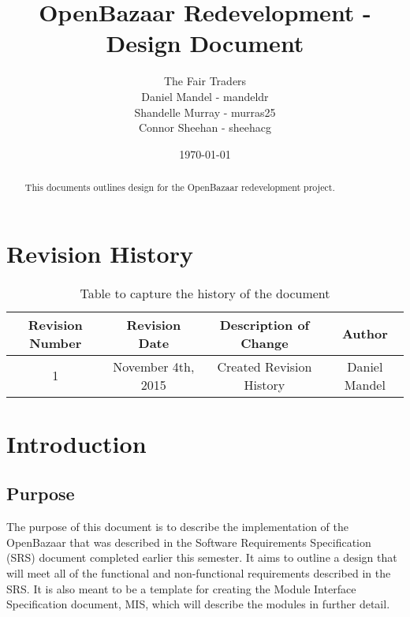 \documentclass{article}
\begin{document}
\title{OpenBazaar Redevelopment - Design Document}
\author{The Fair Traders \\ Daniel Mandel - mandeldr \\ Shandelle Murray - murras25 \\ Connor Sheehan - sheehacg}
\date{\today}
\maketitle

\begin{abstract}
This documents outlines design for the OpenBazaar redevelopment project.
\end{abstract}

\newpage

\tableofcontents


\newpage
\section*{Revision History}

\begin{table}[h!]
\centering
\begin{tabular}{||c c c c||}
 \hline
 Revision Number & Revision Date & Description of Change & Author \\ [0.5ex]
 \hline\hline
 1 & November 4th, 2015 & Created Revision History & Daniel Mandel \\ [1ex]
 \hline
\end{tabular}
\caption{Table to capture the history of the document}
\label{table:1}
\end{table}

\newpage

\section*{Introduction}
\subsection{Purpose}
The purpose of this document is to describe the implementation of the OpenBazaar that was described in the Software Requirements Specification (SRS) document completed earlier this semester. It aims to outline a design that will meet all of the functional and non-functional requirements described in the SRS. It is also meant to be a template for creating the Module Interface Specification document, MIS, which will describe the modules in further detail. 
\end{document}
